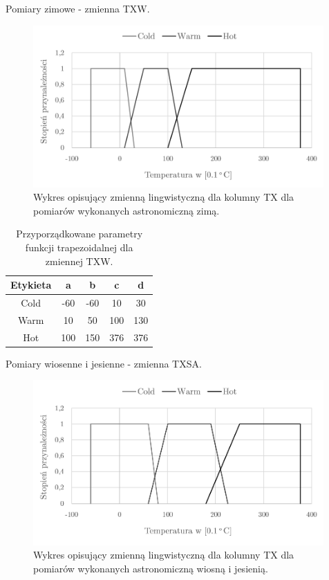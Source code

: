 \documentclass{classrep}
\begin{document}
Pomiary zimowe - zmienna TXW.
\begin{figure}[H]
	\centering
	\includegraphics[width=0.99\textwidth]{Pictures/TermsCharts/TX_Z.png}
	\caption{Wykres opisujący zmienną lingwistyczną dla kolumny TX dla pomiarów wykonanych astronomiczną zimą.}
\end{figure}

\begin{table}[H]
	\centering
	\begin{tabular}{c c c c c} 
		\hline
		\textbf{Etykieta} & \textbf{a} & \textbf{b} & \textbf{c} & \textbf{d}\\ [0.5ex] 
		\hline
		\hline 
Cold	 &-60 & -60 & 10 & 30 \\
Warm & 10 & 50 & 100 & 130 \\
Hot	 & 100 & 150 & 376 & 376 \\
		\hline
	\end{tabular}
	\caption{Przyporządkowane parametry funkcji trapezoidalnej dla zmiennej TXW.}
\end{table}

Pomiary wiosenne i jesienne - zmienna TXSA.
\begin{figure}[H]
	\centering
	\includegraphics[width=0.99\textwidth]{Pictures/TermsCharts/TX_WJ.png}
	\caption{Wykres opisujący zmienną lingwistyczną dla kolumny TX dla pomiarów wykonanych astronomiczną wiosną i jesienią.}
\end{figure}
\end{document}
